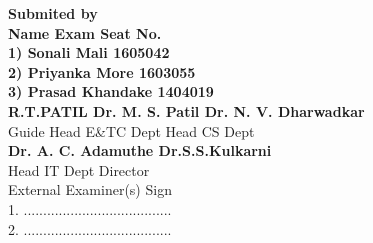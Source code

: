 \documentclass[12pt,a4paper]{article}
\begin{document}
\begin{center}
\textbf{Submited by}\\
\vspace{0.2in}
\textbf{ \hspace{1cm}Name \hspace{5cm} Exam Seat No. \\ }
\vspace{0.2in}
\textbf{ \hspace{-1cm}1) Sonali Mali\hspace{4.5cm} 1605042\\ }
\vspace{0.2in}
\textbf{ \hspace{-1cm}2) Priyanka More\hspace{3.7cm} 1603055\\ }
\vspace{0.2in}
\textbf{ \hspace{-1cm}3) Prasad Khandake\hspace{3.2cm} 1404019\\ }
\vspace{1.5cm}
\textbf{\hspace{0.4cm}R.T.PATIL \hspace{1cm} Dr. M. S. Patil \hspace{1cm} Dr. N. V. Dharwadkar\\}
\vspace{0.1in}
\hspace{-0.3cm}Guide \hspace{1.5cm} Head E\&TC Dept \hspace{1.5cm} Head CS Dept\\
\vspace{1.5cm}
\textbf{\hspace{0.4cm}Dr. A. C. Adamuthe \hspace{5cm} Dr.S.S.Kulkarni \\}
\vspace{0.1in}
\hspace{-0.2cm}Head IT Dept \hspace{7cm} Director\\
\vspace{0.5cm}
\hspace{-2cm}External Examiner(s) \hspace{5cm}Sign\\
\vspace{0.1in}
\hspace{-7cm}1. ......................................\\
\vspace{0.1in}
\hspace{-7cm}2. ......................................\\
\vspace{0.1in}

\end{center}
\end{document}
